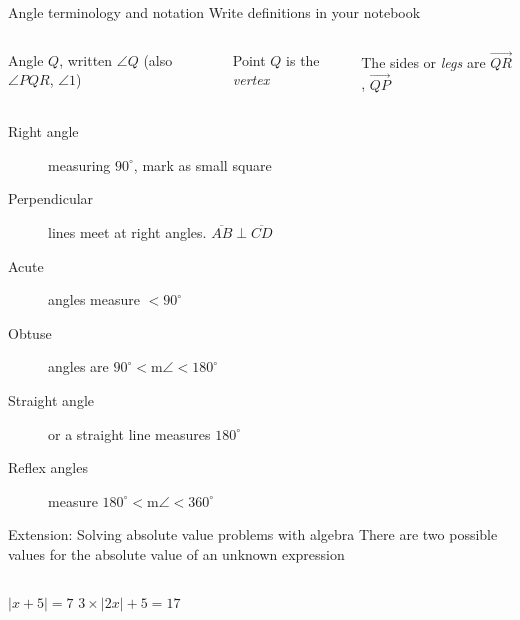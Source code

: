 \documentclass[onlytextwidth]{beamer}
\begin{document}
\begin{frame}{Angle terminology and notation}
  {Write definitions in your notebook}
  \begin{columns}
    Angle $Q$, written $\angle Q$ (also $\angle PQR$, $\angle 1$) \par \medskip
    Point $Q$ is the \emph{vertex} \par \medskip
    The sides or \emph{legs} are $\overrightarrow{QR}$, $\overrightarrow{QP}$  \par \medskip
  \end{columns} \bigskip
  \begin{description}
    \item[Right angle] measuring $90^\circ$, mark as small square
    \item[Perpendicular] lines meet at right angles. $\overline{AB} \perp \overline{CD}$
    \item[Acute] angles measure $< 90^\circ$
    \item[Obtuse] angles are $90^\circ < \text{m}\angle < 180^\circ$
    \item[Straight angle] or a straight line  measures $180^\circ$
    \item[Reflex angles] measure $180^\circ < \text{m}\angle < 360^\circ$
  \end{description}
  \end{frame}

\begin{frame}{Extension: Solving absolute value problems with algebra}
  {There are two possible values for the absolute value of an unknown expression}
  \begin{columns}
      $|x+5|=7$
    $3 \times |2x|+5=17$
  \end{columns}
  \vspace{5cm}
  \end{frame}
\end{document}
